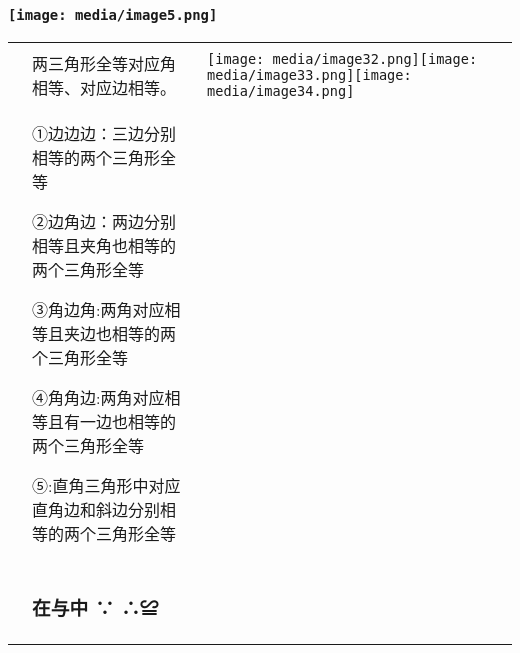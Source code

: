 \documentclass[a4paper,11pt,UTF8]{ctexart}
\begin{document}
\hypertarget{section}{%
\subsubsection{}\label{section}}

\hypertarget{ux5b66ux79d1ux7f51www.zxxk.com--ux6559ux80b2ux8d44ux6e90ux95e8ux6237ux63d0ux4f9bux8bd5ux9898ux8bd5ux5377ux6559ux6848ux8bfeux4ef6ux6559ux5b66ux8bbaux6587ux7d20ux6750ux7b49ux5404ux7c7bux6559ux5b66ux8d44ux6e90ux5e93ux4e0bux8f7dux8fd8ux6709ux5927ux91cfux4e30ux5bccux7684ux6559ux5b66ux8d44ux8baf-10}{%
\subsubsection{\texorpdfstring{\protect\texttt{[image: media/image5.png]}}{学科网(www.zxxk.com)-\/-教育资源门户，提供试题试卷、教案、课件、教学论文、素材等各类教学资源库下载，还有大量丰富的教学资讯！}}\label{ux5b66ux79d1ux7f51www.zxxk.com--ux6559ux80b2ux8d44ux6e90ux95e8ux6237ux63d0ux4f9bux8bd5ux9898ux8bd5ux5377ux6559ux6848ux8bfeux4ef6ux6559ux5b66ux8bbaux6587ux7d20ux6750ux7b49ux5404ux7c7bux6559ux5b66ux8d44ux6e90ux5e93ux4e0bux8f7dux8fd8ux6709ux5927ux91cfux4e30ux5bccux7684ux6559ux5b66ux8d44ux8baf-10}}

\begin{longtable}[]{@{}lll@{}}
\toprule
\endhead
& &\tabularnewline
& 两三角形全等对应角相等、对应边相等。 &
\texttt{[image: media/image32.png]}\texttt{[image: media/image33.png]}\texttt{[image: media/image34.png]}\tabularnewline
\begin{minipage}[t]{0.30\columnwidth}\raggedright
\strut
\end{minipage} & \begin{minipage}[t]{0.30\columnwidth}\raggedright
①边边边：三边分别相等的两个三角形全等

②边角边：两边分别相等且夹角也相等的两个三角形全等

③角边角:两角对应相等且夹边也相等的两个三角形全等

④角角边:两角对应相等且有一边也相等的两个三角形全等

⑤:直角三角形中对应直角边和斜边分别相等的两个三角形全等\strut
\end{minipage} & \begin{minipage}[t]{0.30\columnwidth}\raggedright
\strut
\end{minipage}\tabularnewline
\begin{minipage}[t]{0.30\columnwidth}\raggedright
\strut
\end{minipage} & \begin{minipage}[t]{0.30\columnwidth}\raggedright
\hypertarget{ux5728ux4e0eux4e2d}{%
\subsubsection{在与中 ∵ ∴≌}\label{ux5728ux4e0eux4e2d}}\strut
\end{minipage} & \begin{minipage}[t]{0.30\columnwidth}\raggedright
\strut
\end{minipage}\tabularnewline
\bottomrule
\end{longtable}
\end{document}
